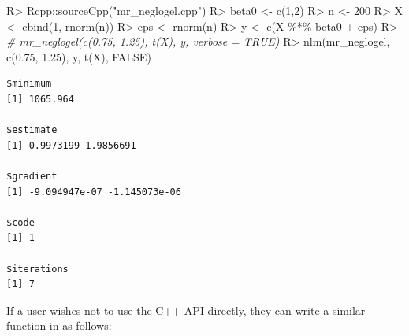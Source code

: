 \documentclass[article]{jss}
\newenvironment{Shaded}{\begin{snugshade}}{\end{snugshade}}
\newcommand{\CommentTok}[1]{\textcolor[rgb]{0.56,0.35,0.01}{\textit{#1}}}
\newcommand{\ConstantTok}[1]{\textcolor[rgb]{0.00,0.00,0.00}{#1}}
\newcommand{\DecValTok}[1]{\textcolor[rgb]{0.00,0.00,0.81}{#1}}
\newcommand{\FloatTok}[1]{\textcolor[rgb]{0.00,0.00,0.81}{#1}}
\newcommand{\FunctionTok}[1]{\textcolor[rgb]{0.00,0.00,0.00}{#1}}
\newcommand{\NormalTok}[1]{#1}
\newcommand{\OtherTok}[1]{\textcolor[rgb]{0.56,0.35,0.01}{#1}}
\newcommand{\SpecialCharTok}[1]{\textcolor[rgb]{0.00,0.00,0.00}{#1}}
\newcommand{\StringTok}[1]{\textcolor[rgb]{0.31,0.60,0.02}{#1}}
\renewcommand{\|}{\,|\,}
\begin{document}
\begin{Shaded}
\begin{Highlighting}[]
\NormalTok{R}\SpecialCharTok{\textgreater{}}\NormalTok{ Rcpp}\SpecialCharTok{::}\FunctionTok{sourceCpp}\NormalTok{(}\StringTok{"mr\_neglogel.cpp"}\NormalTok{)}
\NormalTok{R}\SpecialCharTok{\textgreater{}}\NormalTok{ beta0 }\OtherTok{\textless{}{-}} \FunctionTok{c}\NormalTok{(}\DecValTok{1}\NormalTok{,}\DecValTok{2}\NormalTok{)}
\NormalTok{R}\SpecialCharTok{\textgreater{}}\NormalTok{ n }\OtherTok{\textless{}{-}} \DecValTok{200}
\NormalTok{R}\SpecialCharTok{\textgreater{}}\NormalTok{ X }\OtherTok{\textless{}{-}} \FunctionTok{cbind}\NormalTok{(}\DecValTok{1}\NormalTok{, }\FunctionTok{rnorm}\NormalTok{(n))}
\NormalTok{R}\SpecialCharTok{\textgreater{}}\NormalTok{ eps }\OtherTok{\textless{}{-}} \FunctionTok{rnorm}\NormalTok{(n)}
\NormalTok{R}\SpecialCharTok{\textgreater{}}\NormalTok{ y }\OtherTok{\textless{}{-}} \FunctionTok{c}\NormalTok{(X }\SpecialCharTok{\%*\%}\NormalTok{ beta0 }\SpecialCharTok{+}\NormalTok{ eps)}
\NormalTok{R}\SpecialCharTok{\textgreater{}} \CommentTok{\# mr\_neglogel(c(0.75, 1.25), t(X), y, verbose = TRUE)}
\NormalTok{R}\SpecialCharTok{\textgreater{}} \FunctionTok{nlm}\NormalTok{(mr\_neglogel, }\FunctionTok{c}\NormalTok{(}\FloatTok{0.75}\NormalTok{, }\FloatTok{1.25}\NormalTok{), y, }\FunctionTok{t}\NormalTok{(X), }\ConstantTok{FALSE}\NormalTok{)}
\end{Highlighting}
\end{Shaded}

\begin{verbatim}
$minimum
[1] 1065.964

$estimate
[1] 0.9973199 1.9856691

$gradient
[1] -9.094947e-07 -1.145073e-06

$code
[1] 1

$iterations
[1] 7
\end{verbatim}

If a user wishes not to use the C++ API directly, they can write a similar function in  as follows:
\end{document}
